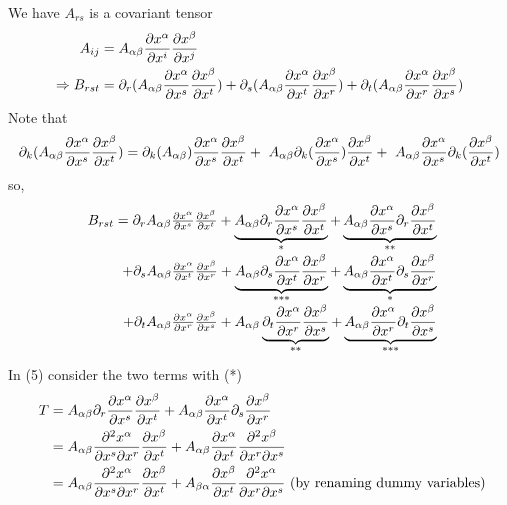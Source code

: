 We have $A_{rs}$ is a covariant tensor
\begin{align}
\ A_{ij} &= A_{\alpha\beta}\pdv{x^{\alpha}}{x^{i}}\pdv{x^{\beta}}{x^{j}}\\
\Rightarrow B_{rst} &= \partial_{r}{(A_{\alpha\beta}\pdv{x^{\alpha}}{x^{s}}\pdv{x^{\beta}}{x^{t}})} + \partial_{s}{(A_{\alpha\beta}\pdv{x^{\alpha}}{x^{t}}\pdv{x^{\beta}}{x^{r}})} +\partial_{t}{(A_{\alpha\beta}\pdv{x^{\alpha}}{x^{r}}\pdv{x^{\beta}}{x^{s}})}
\end{align}
Note that
\begin{align}
\partial_{k}{(A_{\alpha\beta}\pdv{x^{\alpha}}{x^{s}}\pdv{x^{\beta}}{x^{t}})} = 
\partial_{k}{(A_{\alpha\beta})}\pdv{x^{\alpha}}{x^{s}}\pdv{x^{\beta}}{x^{t}}+
\ A_{\alpha\beta}\partial_{k}{(\pdv{x^{\alpha}}{x^{s}})}\pdv{x^{\beta}}{x^{t}}+
\ A_{\alpha\beta}\pdv{x^{\alpha}}{x^{s}} \partial_{k}{(\pdv{x^{\beta}}{x^{t}})}\\
\end{align}
so, 
\begin{align}
\begin{array}{r c l}
\ B_{rst} = \partial_{r}{A_{\alpha\beta}}\pdv{x^{\alpha}}{x^{s}}\pdv{x^{\beta}}{x^{t}}+ \underbrace{A_{\alpha\beta}\partial_{r}{\pdv{x^{\alpha}}{x^{s}}}\pdv{x^{\beta}}{x^{t}}}_\text{*} +\underbrace{A_{\alpha\beta}\pdv{x^{\alpha}}{x^{s}}\partial_{r}{\pdv{x^{\beta}}{x^{t}}}}_\text{**}\\ +
\partial_{s}{A_{\alpha\beta}}\pdv{x^{\alpha}}{x^{t}}\pdv{x^{\beta}}{x^{r}}+\underbrace{A_{\alpha\beta}\partial_{s}{\pdv{x^{\alpha}}{x^{t}}}\pdv{x^{\beta}}{x^{r}}}_\text{***}+\underbrace{A_{\alpha\beta}\pdv{x^{\alpha}}{x^{t}}\partial_{s}{\pdv{x^{\beta}}{x^{r}}}}_\text{*}\\+
\partial_{t}{A_{\alpha\beta}}\pdv{x^{\alpha}}{x^{r}}\pdv{x^{\beta}}{x^{s}}+A_{\alpha\beta}\underbrace{\partial_{t}{\pdv{x^{\alpha}}{x^{r}}}\pdv{x^{\beta}}{x^{s}}}_\text{**}+\underbrace{A_{\alpha\beta}\pdv{x^{\alpha}}{x^{r}}\partial_{t}{\pdv{x^{\beta}}{x^{s}}}}_\text{***}
\end{array}
\end{align}
In (5) consider the two terms with (*) 
\begin{align}
\ T &= A_{\alpha\beta}\partial_{r}{\pdv{x^{\alpha}}{x^{s}}}\pdv{x^{\beta}}{x^{t}}+ A_{\alpha\beta}\pdv{x^{\alpha}}{x^{t}}\partial_{s}{\pdv{x^{\beta}}{x^{r}}}\\
& = A_{\alpha\beta}\pdv{x^{\alpha}}{x^{s}}{x^{r}}\pdv{x^{\beta}}{x^{t}}+ A_{\alpha\beta}\pdv{x^{\alpha}}{x^{t}}\pdv{x^{\beta}}{x^{r}}{x^{s}}\\
& = A_{\alpha\beta}\pdv{x^{\alpha}}{x^{s}}{x^{r}}\pdv{x^{\beta}}{x^{t}}+ A_{\beta\alpha}\pdv{x^{\beta}}{x^{t}}\pdv{x^{\alpha}}{x^{r}}{x^{s}} \text{ (by renaming dummy variables)}
\end{align}
